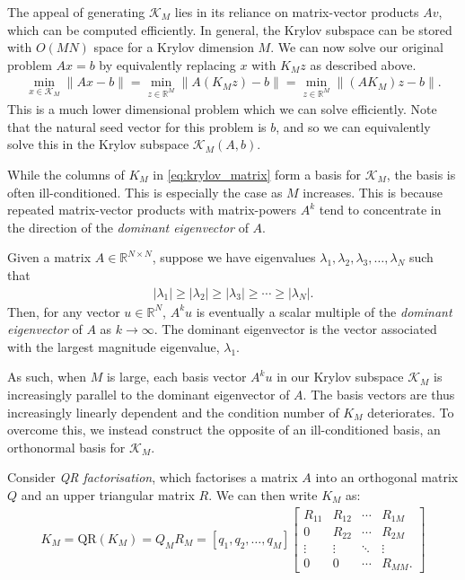 The appeal of generating $\mathcal{K}_M$ lies in its reliance on matrix-vector products $A v$, which can be computed efficiently. In general, the Krylov subspace can be stored with $O(M N)$ space for a Krylov dimension $M$. We can now solve our original problem $Ax = b$ by equivalently replacing $x$ with $K_M z$ as described above.
\begin{align}
    \min_{x \in \mathcal{K}_M} \| A x - b \| = \min_{z \in \mathbb{R}^M} \| A (K_M z) - b \| = \min_{z \in \mathbb{R}^M} \| (A K_M) z - b \|.
    \label{equation:krylov_subspace_problem}
\end{align}
This is a much lower dimensional problem which we can solve efficiently.
Note that the natural seed vector for this problem is $b$, and so we can equivalently solve this in the Krylov subspace $\mathcal{K}_M(A, b)$.

While the columns of $K_M$ in \cref{eq:krylov_matrix} form a basis for $\mathcal{K}_M$, the basis is often ill-conditioned. This is especially the case as $M$ increases. This is because repeated matrix-vector products with matrix-powers $A^k$ tend to concentrate in the direction of the \textit{dominant eigenvector} of $A$.
\begin{definition}
    Given a matrix $A \in \mathbb{R}^{N \times N}$, suppose we have eigenvalues $\lambda_1, \lambda_2, \lambda_3, \ldots, \lambda_N$ such that 
    \begin{align}
        |\lambda_1| \geq |\lambda_2| \geq |\lambda_3| \geq \cdots \geq |\lambda_N|.
    \end{align}
    Then, for any vector $u \in \mathbb{R}^N$, $A^k u$ is eventually a scalar multiple of the \textit{dominant eigenvector} of $A$ as $k \to \infty$. The dominant eigenvector is the vector associated with the largest magnitude eigenvalue, $\lambda_1$.
\end{definition}

As such, when $M$ is large, each basis vector $A^k u$ in our Krylov subspace $\mathcal{K}_M$ is increasingly parallel to the dominant eigenvector of $A$. The basis vectors are thus increasingly linearly dependent and the condition number of $K_M$ deteriorates. To overcome this, we instead construct the opposite of an ill-conditioned basis, an orthonormal basis for $\mathcal{K}_M$. 

Consider \textit{QR factorisation}, which factorises a matrix $A$ into an orthogonal matrix $Q$ and an upper triangular matrix $R$. We can then write $K_M$ as:
\begin{align}
K_M = \text{QR}(K_M) = Q_M R_M = [q_1, q_2, \ldots, q_M] 
\begin{bmatrix} 
R_{11} & R_{12} & \cdots & R_{1M} \\ 
0 & R_{22} & \cdots & R_{2M} \\ 
\vdots & \vdots & \ddots & \vdots \\ 
0 & 0 & \cdots & R_{MM}.
\end{bmatrix}
\end{align}

